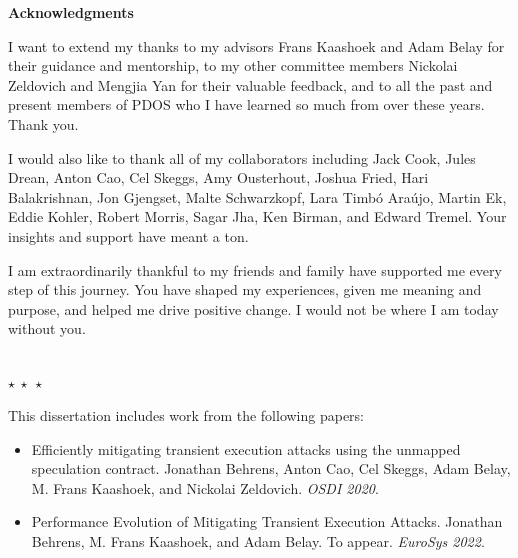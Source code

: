 
{\noindent \huge \bf Acknowledgments\\}

I want to extend my thanks to my advisors Frans Kaashoek and Adam Belay
for their guidance and mentorship, to my other committee members Nickolai Zeldovich and Mengjia Yan for their valuable feedback, and to all the past and present members of PDOS who I have learned so much from over these years.
Thank you.

I would also like to thank all of my collaborators including Jack Cook, Jules Drean, Anton Cao, Cel Skeggs, Amy Ousterhout, Joshua Fried, Hari Balakrishnan, Jon Gjengset, Malte Schwarzkopf, Lara Timbó Araújo, Martin Ek, Eddie Kohler, Robert Morris, Sagar Jha, Ken Birman, and Edward Tremel. Your insights and support have meant a ton.

I am extraordinarily thankful to my friends and family have supported me every step of this journey.
You have shaped my experiences, given me meaning and purpose, and helped me drive positive change.
I would not be where I am today without you.

\begin{center}
    ~\\[0.5\baselineskip]
    $\star~\star~\star$
    ~\\[\baselineskip]
\end{center}


\noindent
This dissertation includes work from the following papers:
\begin{itemize}
\item Efficiently mitigating transient execution attacks using the unmapped speculation contract. 
    Jonathan Behrens, Anton Cao, Cel Skeggs, Adam Belay, M. Frans Kaashoek, and Nickolai Zeldovich.
    \textit{OSDI 2020}.
\item Performance Evolution of Mitigating Transient Execution Attacks. 
    Jonathan Behrens, M. Frans Kaashoek, and Adam Belay.
    To appear. \textit{\mbox{EuroSys} 2022}.
\end{itemize}
